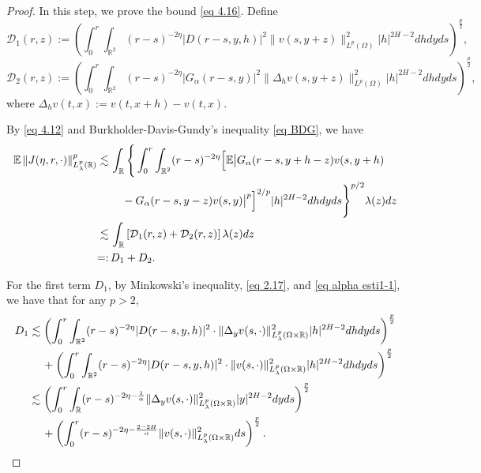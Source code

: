 \documentclass[11pt,reqno]{amsart}
\numberwithin{equation}{section}
\newcommand{\1}{{\bf 1}}
\newcommand{\2}{{\bf 2}}
\begin{document}
\begin{proof}
 In this step,  we prove the   bound \eqref{eq 4.16}. Define
$$
\mathcal{D}_{1}(r,z):=\left(\int_0^r\int_{\mathbb{R}^2}(r-s)^{-2\eta}|D(r-s,y,h)|^2\|v(s,y+z)\|_{L^p(\Omega)}^2|h|^{2H-2}dhdyds\right)^{\frac{p}{2}},
$$ 
$$
\mathcal{D}_{2}(r,z):=\left(\int_0^r\int_{\mathbb{R}^2}(r-s)^{-2\eta}|G_{\alpha}(r-s,y)|^2\|\Delta_hv(s,y+z)\|_{L^p(\Omega)}^2|h|^{2H-2}dhdyds\right)^{\frac{p}{2}},
$$
where $\Delta_hv(t,x):=v(t,x+h)-v(t,x)$. 

By \eqref{eq 4.12}  and  Burkholder-Davis-Gundy's inequality \eqref{eq BDG}, we have
\begin{align*}
\mathbb{E}\left\|J(\eta,r,\cdot)\right\|_{L^p_{\lambda}(\mathbb{R})}^p\lesssim &\, \int_{\mathbb{R}}\Bigg\{\int_0^r\int_{\mathbb{R}^2} (r-s)^{-2\eta}\Big[\mathbb{E}\big|G_{\alpha}(r-s,y+h-z)v(s,y+h)\\
&\hskip 12pt-G_{\alpha}(r-s,y-z)v(s,y)\big|^{p}\Big]^{2/p}|h|^{2H-2}dhdyds\Bigg\}^{p/2}\lambda(z)dz\\
 \lesssim& \,  \int_{\mathbb{R}}\left[\mathcal{D}_1(r,z)+\mathcal{D}_2(r,z)\right]\lambda(z)dz\\
=: &\, D_1+D_2.
\end{align*}

For the first term $D_1$, by Minkowski's inequality,    \eqref{eq  2.17}, and \eqref{eq alpha esti1-1}, we have that  for any  $p>2$,
\begin{equation}\label{eq 4.17}
\begin{split}
D_1&\lesssim  \left(\int_0^r\int_{\mathbb{R}^2}(r-s)^{-2\eta}
|D(r-s,y,h)|^2\cdot \|\Delta_yv(s,\cdot)\|_{L_{\lambda}^p(\Omega\times\mathbb{R})}^2|h|^{2H-2}dhdyds\right)^{\frac{p}{2}} \\
&\hskip 12pt+\left(\int_0^r\int_{\mathbb{R}^2}(r-s)^{-2\eta}|D(r-s,y,h)|^2\cdot \|v(s,\cdot)\|_{L_{\lambda}^p(\Omega\times\mathbb{R})}^2|h|^{2H-2}dhdyds\right)^{\frac{p}{2}} \\
&\lesssim \left(\int_0^r\int_{\mathbb{R}}(r-s)^{-2\eta-\frac{1}{\alpha}}\|\Delta_yv(s,\cdot)\|_{L_{\lambda}^p(\Omega\times\mathbb{R})}^2|y|^{2H-2}dyds\right)^{\frac{p}{2}} \\
&\hskip 12pt+\left(\int_0^r(r-s)^{-2\eta-\frac{2-2H}{\alpha}} \|v(s,\cdot)\|_{L_{\lambda}^p(\Omega\times\mathbb{R})}^2 ds\right)^{\frac{p}{2}}.
\end{split}
\end{equation} 



\end{proof}
\end{document}
